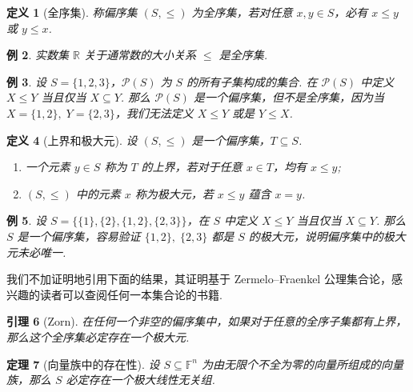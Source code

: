 \documentclass[10pt,openany]{article}
\theoremstyle{thmstyle} %
\newtheorem{theorem}{定理}[subsection]
\theoremstyle{defstyle} %
\newtheorem{definition}[theorem]{定义}
\newtheorem{lemma}[theorem]{引理}
\theoremstyle{prostyle} %
\theoremstyle{exastyle}
\newtheorem{example}[theorem]{例}
\theoremstyle{remstyle}
\newcommand{\F}{\mathbb{F}}
\newcommand{\R}{\mathbb{R}}
\begin{document}
\begin{definition}[全序集]
	称偏序集 \( (S,\leq) \) 为全序集，若对任意 \( x,y \in S \)，必有 \( x \leq y \) 或 \( y \leq x \). 
\end{definition}


\begin{example}
	实数集 \( \R \) 关于通常数的大小关系 \( \leq \) 是全序集.
\end{example}


\begin{example}
	设 \( S=\{1,2,3\} \)，\( \mathcal{P}(S) \) 为 \( S \) 的所有子集构成的集合. 在 \( \mathcal{P}(S) \) 中定义 \( X \leq Y \) 当且仅当 \( X \subseteq Y \). 那么 \( \mathcal{P}(S) \) 是一个偏序集，但不是全序集，因为当 \( X=\{1,2\}, \; Y=\{2,3\} \)，我们无法定义 \( X \leq Y \) 或是 \( Y \leq X \).
\end{example}


\begin{definition}[上界和极大元]
	设 \( (S,\leq) \) 是一个偏序集，\( T \subseteq S \).
	\begin{enumerate}[(1)]
		\item 一个元素 \( y \in S \) 称为 \( T \) 的上界，若对于任意 \( x \in T \)，均有 \( x \leq y \);
		\item \( (S,\leq) \) 中的元素 \( x \) 称为极大元，若 \( x \leq y \) 蕴含 \( x=y \).
	\end{enumerate}
\end{definition}


\begin{example}
	设 \( S=\{\{1\},\{2\},\{1,2\},\{2,3\}\} \)，在 \( S \) 中定义 \( X \leq Y \) 当且仅当 \( X \subseteq Y \). 那么 \( S \) 是一个偏序集，容易验证 \( \{1,2\}, \; \{2,3\} \) 都是 \( S \) 的极大元，说明偏序集中的极大元未必唯一.
\end{example}

我们不加证明地引用下面的结果，其证明基于 Zermelo–Fraenkel 公理集合论，感兴趣的读者可以查阅任何一本集合论的书籍.

\begin{lemma}[Zorn] \label{5.2.11}
	在任何一个非空的偏序集中，如果对于任意的全序子集都有上界，那么这个全序集必定存在一个极大元.
\end{lemma}


\begin{theorem}[向量族中的存在性] \label{5.2.12}
	设 \( S \subseteq \F^n \) 为由无限个不全为零的向量所组成的向量族，那么 \( S \) 必定存在一个极大线性无关组.
\end{theorem}
\end{document}
